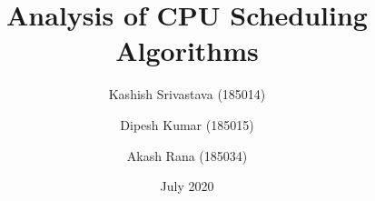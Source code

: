 \documentclass[11pt,a4paper]{report}
\begin{document}
\title{Analysis of CPU Scheduling Algorithms}


\author{Kashish Srivastava (185014)\\
        \and 
        Dipesh Kumar (185015)\\
        \and
        Akash Rana (185034)
}

\titleformat{\chapter}{\bfseries\huge\centering}{}{0pt}{}{\huge}
\titlespacing*{\chapter}{0pt}{-60pt}{20pt}
\setlength{\parindent}{2em}
\setlength{\parskip}{1em}

\newenvironment{myindentpar}[1]
  {\begin{list}{}
          {\setlength{\leftmargin}{#1}}
          
  }
  {\end{list}}
\date{July 2020}

\pagestyle{plain}
\end{document}
